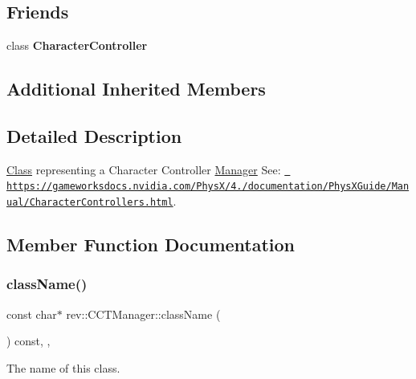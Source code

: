 \subsection*{Friends}
\begin{DoxyCompactItemize}
\item 
\mbox{\label{classrev_1_1_c_c_t_manager_aac6deedeabebc6401d4e2d55e3ca83f1}} 
class {\bfseries Character\+Controller}
\end{DoxyCompactItemize}
\subsection*{Additional Inherited Members}


\subsection{Detailed Description}
\mbox{\hyperlink{struct_class}{Class}} representing a Character Controller \mbox{\hyperlink{classrev_1_1_manager}{Manager}} See\+: \href{https://gameworksdocs.nvidia.com/PhysX/4.0/documentation/PhysXGuide/Manual/CharacterControllers.html}{\texttt{ https\+://gameworksdocs.\+nvidia.\+com/\+Phys\+X/4./documentation/\+Phys\+X\+Guide/\+Manual/\+Character\+Controllers.\+html}}. 

\subsection{Member Function Documentation}
\mbox{\label{classrev_1_1_c_c_t_manager_aef919c90f9877381d2f2c1ef24839741}} 
\subsubsection{\texorpdfstring{className()}{className()}}
{\footnotesize\ttfamily const char$\ast$ rev\+::\+C\+C\+T\+Manager\+::class\+Name (\begin{DoxyParamCaption}{ }\end{DoxyParamCaption}) const\hspace{0.3cm}{\ttfamily [inline]}, {\ttfamily [override]}, {\ttfamily [virtual]}}



The name of this class. 

